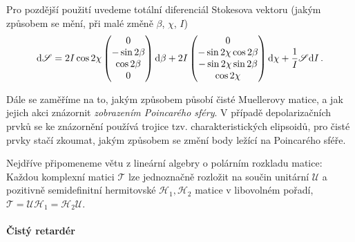 Pro pozdější použití uvedeme totální diferenciál Stokesova vektoru (jakým způsobem se mění, při malé změně $\beta$, $\chi$, $I$)
\begin{equation}
\label{eqn:Stokes-diferencial}
    \textrm{d}\mathscr{S} = 
    2I\cos2\chi \begin{pmatrix} 0\\-\sin2\beta\\\cos2\beta\\0 \end{pmatrix} \textrm{d}\beta 
    + 2I\begin{pmatrix} 0\\-\sin2\chi\cos2\beta\\-\sin2\chi\sin2\beta\\\cos2\chi \end{pmatrix}\textrm{d}\chi
    + \frac{1}{I}\mathscr{S}\textrm{d}I \,.
\end{equation}


Dále se zaměříme na to, jakým způsobem působí čisté Muellerovy matice, a jak jejich akci znázornit \emph{zobrazením Poincarého sféry}\cite{gilReviewMuellerMatrix2014,ossikovskiPoincareSphereMapping2013}.
V případě depolarizačních prvků se ke znázornění používá trojice tzv. charakteristických elipsoidů, pro čisté prvky stačí zkoumat, jakým způsobem se změní body ležící na Poincarého sféře.

Nejdříve připomeneme větu z lineární algebry o polárním rozkladu matice\cite{motlPestujemeLinearniAlgebru2002}: Každou komplexní matici $\mathcal{T}$ lze jednoznačně rozložit na součin unitární $\mathcal{U}$ a pozitivně semidefinitní hermitovské $\mathcal{H}_1, \mathcal{H}_2$ matice v libovolném pořadí, $\mathcal{T}=\mathcal{U}\mathcal{H}_1 = \mathcal{H}_2 \mathcal{U}$.

\paragraph{Čistý retardér}

